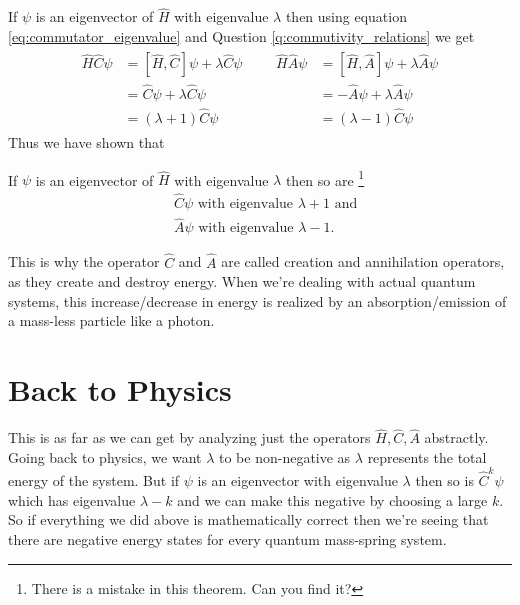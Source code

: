 \noindent If $\psi$ is an eigenvector of $\hat{H}$ with eigenvalue $\lambda$ then using equation \eqref{eq:commutator_eigenvalue} and Question \ref{q:commutivity_relations} we get
\begin{align*}
	\begin{aligned}
		\hat{H} \hat {C} \psi
		&= [\hat{H}, \hat{C}] \psi + \lambda \hat{C}  \psi \\
		&= \hat{C} \psi + \lambda \hat{C}  \psi \\
		&= (\lambda + 1)\hat{C} \psi
	\end{aligned} &&
	 \begin{aligned}
		\hat{H} \hat {A} \psi
		&= [\hat{H}, \hat{A}] \psi + \lambda \hat{A}  \psi \\
		&= -\hat{A} \psi + \lambda \hat{A}  \psi \\
		&= (\lambda - 1)\hat{C} \psi
	\end{aligned}
\end{align*}
Thus we have shown that
\begin{thm}
	\label{thm:shifts}
	If $\psi$ is an eigenvector of $\hat{H}$ with eigenvalue $\lambda$ then so are
	 \footnote{There is a mistake in this theorem. Can you find it?}
	\begin{align*}
		&\hat{C} \psi \mbox{ with eigenvalue } \lambda + 1  \mbox{ and} \\
		&\hat{A} \psi \mbox{ with eigenvalue } \lambda - 1.
	\end{align*}
\end{thm}
This is why the operator $\hat{C}$ and $\hat{A}$ are called creation and annihilation operators, as they create and destroy {energy}. When we're dealing with actual quantum systems, this increase/decrease in energy is realized by an absorption/emission of a mass-less particle like a photon.

\section{Back to Physics}

This is as far as we can get by analyzing just the operators $\hat{H}, \hat{C}, \hat{A}$ abstractly. Going back to physics, we want $\lambda$ to be non-negative as $\lambda$ represents the total energy of the system. But if $\psi$ is an eigenvector with eigenvalue $\lambda$ then so is $\hat{C}^k \psi$ which has eigenvalue $\lambda-k$ and we can make this negative by choosing a large $k$. So if everything we did above is mathematically correct then we're seeing that there are negative energy states for every quantum mass-spring system.

